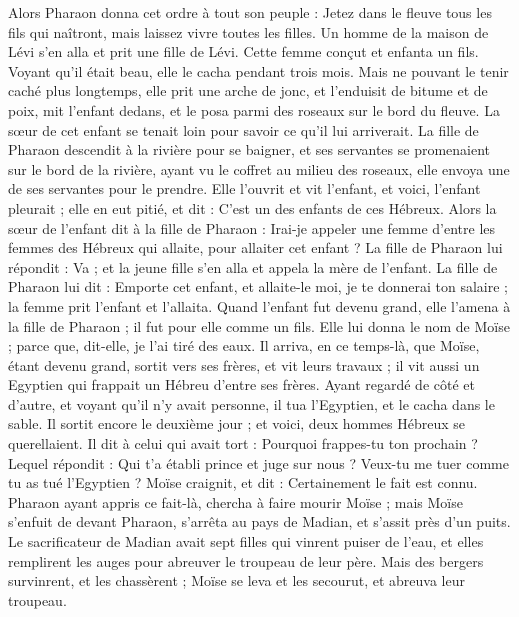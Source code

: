 \begin{multicols}{2}
Alors Pharaon donna cet ordre à tout son peuple : Jetez dans le fleuve tous les fils qui naîtront, mais laissez vivre toutes les filles.
\VerseOne{}Un homme de la maison de Lévi s'en alla et prit une fille de Lévi\FTNT{}.
Cette femme conçut et enfanta un fils. Voyant qu'il était beau, elle le cacha pendant trois mois\FTNT{}.
Mais ne pouvant le tenir caché plus longtemps, elle prit une arche de jonc, et l'enduisit de bitume et de poix, mit l'enfant dedans, et le posa parmi des roseaux sur le bord du fleuve.
La sœur de cet enfant se tenait loin pour savoir ce qu'il lui arriverait.
La fille de Pharaon descendit à la rivière pour se baigner, et ses servantes se promenaient sur le bord de la rivière, ayant vu le coffret au milieu des roseaux, elle envoya une de ses servantes pour le prendre.
Elle l’ouvrit et vit l'enfant, et voici, l'enfant pleurait ; elle en eut pitié, et dit : C'est un des enfants de ces Hébreux.
Alors la sœur de l'enfant dit à la fille de Pharaon : Irai-je appeler une femme d'entre les femmes des Hébreux qui allaite, pour allaiter cet enfant ?
La fille de Pharaon lui répondit : Va ; et la jeune fille s'en alla et appela la mère de l'enfant.
La fille de Pharaon lui dit : Emporte cet enfant, et allaite-le moi, je te donnerai ton salaire ; la femme prit l'enfant et l'allaita.
Quand l'enfant fut devenu grand, elle l'amena à la fille de Pharaon ; il fut pour elle comme un fils. Elle lui donna le nom de Moïse ; parce que, dit-elle, je l'ai tiré des eaux.
Il arriva, en ce temps-là, que Moïse, étant devenu grand, sortit vers ses frères, et vit leurs travaux ; il vit aussi un Egyptien qui frappait un Hébreu d'entre ses frères\FTNT{}.
Ayant regardé de côté et d’autre, et voyant qu'il n'y avait personne, il tua l'Egyptien, et le cacha dans le sable.
Il sortit encore le deuxième jour ; et voici, deux hommes Hébreux se querellaient. Il dit à celui qui avait tort : Pourquoi frappes-tu ton prochain ?
Lequel répondit : Qui t'a établi prince et juge sur nous ? Veux-tu me tuer comme tu as tué l'Egyptien ? Moïse craignit, et dit : Certainement le fait est connu.
Pharaon ayant appris ce fait-là, chercha à faire mourir Moïse ; mais Moïse s'enfuit de devant Pharaon, s'arrêta au pays de Madian, et s'assit près d'un puits.
Le sacrificateur de Madian avait sept filles qui vinrent puiser de l'eau, et elles remplirent les auges pour abreuver le troupeau de leur père.
Mais des bergers survinrent, et les chassèrent ; Moïse se leva et les secourut, et abreuva leur troupeau.

\end{multicols}
